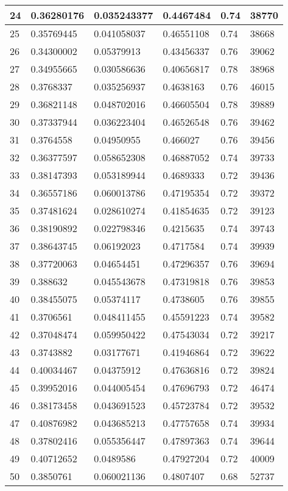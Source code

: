 \begin{longtable}{|l|l|l|l|l|l|}
24 & 0.36280176 & 0.035243377 & 0.4467484 & 0.74 & 38770 \\ \hline 
25 & 0.35769445 & 0.041058037 & 0.46551108 & 0.74 & 38668 \\ \hline 
26 & 0.34300002 & 0.05379913 & 0.43456337 & 0.76 & 39062 \\ \hline 
27 & 0.34955665 & 0.030586636 & 0.40656817 & 0.78 & 38968 \\ \hline 
28 & 0.3768337 & 0.035256937 & 0.4638163 & 0.76 & 46015 \\ \hline 
29 & 0.36821148 & 0.048702016 & 0.46605504 & 0.78 & 39889 \\ \hline 
30 & 0.37337944 & 0.036223404 & 0.46526548 & 0.76 & 39462 \\ \hline 
31 & 0.3764558 & 0.04950955 & 0.466027 & 0.76 & 39456 \\ \hline 
32 & 0.36377597 & 0.058652308 & 0.46887052 & 0.74 & 39733 \\ \hline 
33 & 0.38147393 & 0.053189944 & 0.4689333 & 0.72 & 39436 \\ \hline 
34 & 0.36557186 & 0.060013786 & 0.47195354 & 0.72 & 39372 \\ \hline 
35 & 0.37481624 & 0.028610274 & 0.41854635 & 0.72 & 39123 \\ \hline 
36 & 0.38190892 & 0.022798346 & 0.4215635 & 0.74 & 39743 \\ \hline 
37 & 0.38643745 & 0.06192023 & 0.4717584 & 0.74 & 39939 \\ \hline 
38 & 0.37720063 & 0.04654451 & 0.47296357 & 0.76 & 39694 \\ \hline 
39 & 0.388632 & 0.045543678 & 0.47319818 & 0.76 & 39853 \\ \hline 
40 & 0.38455075 & 0.05374117 & 0.4738605 & 0.76 & 39855 \\ \hline 
41 & 0.3706561 & 0.048411455 & 0.45591223 & 0.74 & 39582 \\ \hline 
42 & 0.37048474 & 0.059950422 & 0.47543034 & 0.72 & 39217 \\ \hline 
43 & 0.3743882 & 0.03177671 & 0.41946864 & 0.72 & 39622 \\ \hline 
44 & 0.40034467 & 0.04375912 & 0.47636816 & 0.72 & 39824 \\ \hline 
45 & 0.39952016 & 0.044005454 & 0.47696793 & 0.72 & 46474 \\ \hline 
46 & 0.38173458 & 0.043691523 & 0.45723784 & 0.72 & 39532 \\ \hline 
47 & 0.40876982 & 0.043685213 & 0.47757658 & 0.74 & 39934 \\ \hline 
48 & 0.37802416 & 0.055356447 & 0.47897363 & 0.74 & 39644 \\ \hline 
49 & 0.40712652 & 0.0489586 & 0.47927204 & 0.72 & 40009 \\ \hline 
50 & 0.3850761 & 0.060021136 & 0.4807407 & 0.68 & 52737 \\ \hline 
\end{longtable}